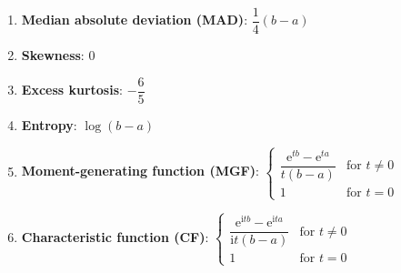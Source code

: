 \begin{enumerate}
    \item \textbf{Median absolute deviation (MAD)}: 
    $
        {\displaystyle {\dfrac {1}{4}}(b-a)}
    $
    \hfill \cite{wiki/Continuous_uniform_distribution}

    \item \textbf{Skewness}:
    $0$
    \hfill \cite{wiki/Continuous_uniform_distribution}

    \item \textbf{Excess kurtosis}: 
    $ -\dfrac{6}{5}$
    \hfill \cite{wiki/Continuous_uniform_distribution}

    \item \textbf{Entropy}: $ {\displaystyle \log(b-a)} $
    \hfill \cite{wiki/Continuous_uniform_distribution}

    \item \textbf{Moment-generating function (MGF)}: 
    $
        {\displaystyle {\begin{cases}{\dfrac {\mathrm {e} ^{tb}-\mathrm {e} ^{ta}}{t(b-a)}}&{\text{for }}t\neq 0\\1&{\text{for }}t=0\end{cases}}}
    $
    \hfill \cite{wiki/Continuous_uniform_distribution}
    
    \item \textbf{Characteristic function (CF)}:
    $
        {\displaystyle {\begin{cases}{\dfrac {\mathrm {e} ^{\mathrm {i} tb}-\mathrm {e} ^{\mathrm {i} ta}}{\mathrm {i} t(b-a)}}&{\text{for }}t\neq 0\\1&{\text{for }}t=0\end{cases}}}
    $
    \hfill \cite{wiki/Continuous_uniform_distribution}

\end{enumerate}







